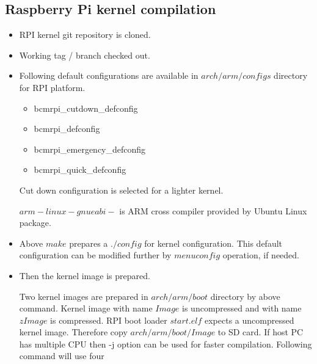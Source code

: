 \subsection {Raspberry Pi kernel compilation}
\begin{itemize}
 \item RPI kernel git repository is cloned.\par
  \par
 \item Working tag / branch checked out.\par
  \par
 \item Following default configurations are available in
 $arch/arm/configs$ directory for RPI platform. 
 \begin{itemize}
 \item bcmrpi\_cutdown\_defconfig
 \item bcmrpi\_defconfig
 \item bcmrpi\_emergency\_defconfig
 \item bcmrpi\_quick\_defconfig
 \end{itemize}
 Cut down configuration is selected for a lighter
 kernel.\par
  \par
 $arm-linux-gnueabi-$ is ARM cross compiler provided by Ubuntu Linux package. 
 \item Above $make$ prepares a $./config$ for kernel configuration.
 This default configuration can be modified further by
 $menuconfig$ operation, if needed.\par
  \par
 \item Then the kernel image is prepared.\par
  \par
 Two kernel images are prepared in $arch/arm/boot$ directory by
 above command. Kernel image with name $Image$ is
 uncompressed and with name $zImage$ is compressed. RPI
 boot loader $start.elf$ expects a uncompressed kernel
 image. Therefore copy $arch/arm/boot/Image$ to SD card.
 If host PC has multiple CPU then -j option can be used
 for faster compilation. Following command will use four

\end{itemize}
